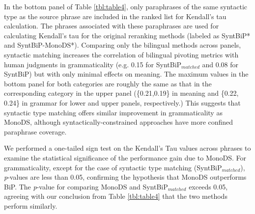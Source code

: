 \documentclass[11pt]{article}
\newcommand{\mnote}[1]{\marginpar{\raggedleft\footnotesize\itshape#1}}
\begin{document}
In the bottom panel of Table \ref{tbl:table4}, only paraphrases of the same syntactic type as the source phrase are included in the ranked list for Kendall's tau calculation. The phrases associated with these paraphrases are used for calculating Kendall's tau for the original reranking methods (labeled as SyntBiP* and SyntBiP-MonoDS*). Comparing only the bilingual methods across panels, syntactic matching increases the correlation of bilingual pivoting metrics with human judgments in grammaticality (e.g. 0.15 for SyntBiP$_{matched}$ and 0.08 for SyntBiP) but with only minimal effects on meaning. The maximum values in the bottom panel for both categories are roughly the same as that in the corresponding category in the upper panel (\{0.21,0.19\} in meaning and \{0.22, 0.24\} in grammar for lower and upper panels, respectively.) This suggests that syntactic type matching offers similar improvement in grammaticality as MonoDS, although syntactically-constrained approaches have more confined paraphrase coverage.

We performed a one-tailed sign test on the Kendall's Tau values across phrases to examine the statistical significance of the performance gain due to MonoDS. For grammaticality, except for the case of syntactic type matching (SyntBiP$_{matched}$), \emph{p}-values are less than 0.05, confirming the hypothesis that MonoDS outperforms BiP. The \emph{p}-value for comparing MonoDS and SyntBiP$_{matched}$ exceeds 0.05, agreeing with our conclusion from Table \ref{tbl:table4} that the two methods perform similarly.
\end{document}
